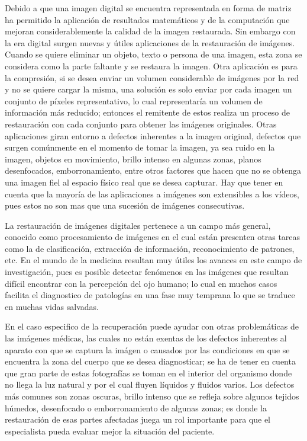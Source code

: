 Debido a que una imagen digital se encuentra representada en forma de matriz ha permitido la aplicaci\'on de resultados matem\'aticos y de la computaci\'on que mejoran considerablemente la calidad de la imagen restaurada. Sin embargo con la era digital surgen nuevas y \'utiles aplicaciones de la restauraci\'on de im\'agenes. Cuando se quiere eliminar un objeto, texto o persona de una imagen, esta zona se considera como la parte faltante y se restaura la imagen. Otra aplicaci\'on es para la compresi\'on, si se desea enviar un volumen considerable de imágenes por la red y no se quiere cargar la misma, una solución es solo enviar por cada imagen un conjunto de p\'ixeles representativo, lo cual representaría un volumen de informaci\'on m\'as reducido; entonces el remitente de estos realiza un proceso de restauraci\'on con cada conjunto para obtener las imágenes originales. Otras aplicaciones giran entorno a defectos inherentes a la imagen original, defectos que surgen comúnmente en el momento de tomar la imagen, ya sea ruido en la imagen, objetos en movimiento, brillo intenso en algunas zonas, planos desenfocados, emborronamiento, entre otros factores que hacen que no se obtenga una imagen fiel al espacio físico real que se desea capturar. Hay que tener en cuenta que la mayor\'ia de las aplicaciones a im\'agenes son extensibles a los vídeos, pues estos no son mas que una sucesión de imágenes consecutivas.

La restauraci\'on de im\'agenes digitales pertenece a un campo m\'as general, conocido como procesamiento de im\'agenes en el cual est\'an presenten otras tareas como la de clasificaci\'on, extracci\'on de informaci\'on, reconocimiento de patrones, etc. En el mundo de la medicina resultan muy \'utiles los avances en este campo de investigaci\'on, pues es posible detectar fen\'omenos en las im\'agenes que resultan difícil encontrar con la percepción del ojo humano; lo cual en muchos casos facilita el diagnostico de patologías en una fase muy temprana lo que se traduce en muchas vidas salvadas. 

En el caso especifico de la recuperaci\'on puede ayudar con otras problemáticas de las im\'agenes m\'edicas, las cuales no est\'an exentas de los defectos inherentes al aparato con que se captura la im\'agen o causados por las condiciones en que se encuentra la zona del cuerpo que se desea diagnosticar; se ha de tener en cuenta que gran parte de estas fotograf\'ias se toman en el interior del organismo donde no llega la luz natural y por el cual fluyen l\'iquidos y fluidos varios. Los defectos m\'as comunes son zonas oscuras, brillo intenso que se refleja sobre algunos tejidos h\'umedos, desenfocado o emborronamiento de algunas zonas; es donde la restauraci\'on de esas partes afectadas juega un rol importante para que el especialista pueda evaluar mejor la situaci\'on del paciente.


